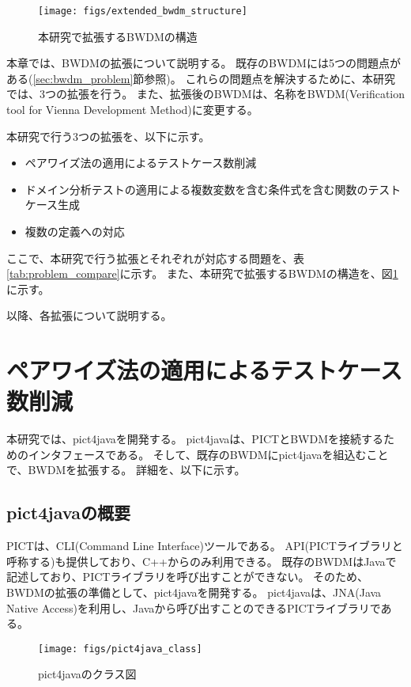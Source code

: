 \documentclass[uplatex, report, a4j, 10pt]{jsbook}
\newcommand{\tool}{BWDM}
\newcommand{\toolFullName}{Verification tool for Vienna Development Method}
\begin{document}
\begin{figure}[tp]
  \centering
  \texttt{[image: figs/extended\_bwdm\_structure]}
  \caption{本研究で拡張するBWDMの構造}
  \label{fig:extendedBwdmStructure}
\end{figure}

本章では、\tool{}の拡張について説明する。
既存のBWDMには5つの問題点がある(\ref{sec:bwdm_problem}節参照)。
これらの問題点を解決するために、本研究では、3つの拡張を行う。
また、拡張後のBWDMは、名称を\tool{}(\toolFullName{})に変更する。

本研究で行う3つの拡張を、以下に示す。
\begin{itemize}
  \item ペアワイズ法の適用によるテストケース数削減
  \item ドメイン分析テストの適用による複数変数を含む条件式を含む関数のテストケース生成
  \item 複数の定義への対応
\end{itemize}

ここで、本研究で行う拡張とそれぞれが対応する問題を、表\ref{tab:problem_compare}に示す。
また、本研究で拡張するBWDMの構造を、図\ref{fig:extendedBwdmStructure}に示す。

以降、各拡張について説明する。

\section{ペアワイズ法の適用によるテストケース数削減}\label{sec:extendPairwise}
本研究では、pict4javaを開発する\cite{hirakoba3}。
pict4javaは、PICTとBWDMを接続するためのインタフェースである。
そして、既存のBWDMにpict4javaを組込むことで、BWDMを拡張する。
詳細を、以下に示す。

\subsection{pict4javaの概要}\label{sec:create_pict4java}
PICTは、CLI(Command Line Interface)ツールである。
API(PICTライブラリと呼称する)も提供しており、C++からのみ利用できる。
既存のBWDMはJavaで記述しており、PICTライブラリを呼び出すことができない。
そのため、BWDMの拡張の準備として、pict4javaを開発する。
pict4javaは、JNA(Java Native Access)\cite{jna}を利用し、Javaから呼び出すことのできるPICTライブラリである。

\begin{figure}[tp]
  \centering
  \texttt{[image: figs/pict4java\_class]}
  \caption{pict4javaのクラス図}
  \label{fig:pict4javaClass}
\end{figure}
\end{document}
